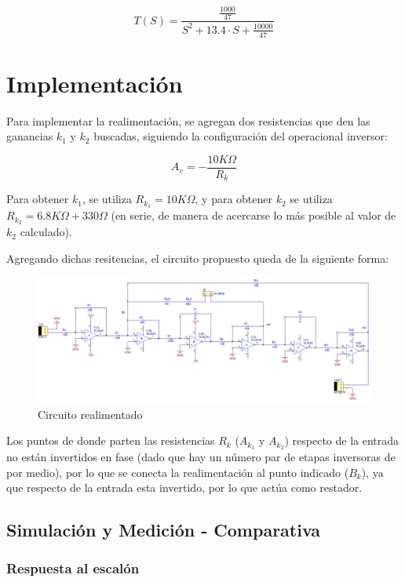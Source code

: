 \documentclass{article}
\begin{document}
\[
T(S) = \frac{\frac{1000}{47}}{S^2 + 13.4 \cdot S + \frac{10000}{47}}
\]

\section{Implementación}

Para implementar la realimentación, se agregan dos resistencias que den las ganancias $k_1$ y $k_2$ buscadas, siguiendo la configuración del operacional inversor:

\[
A_v = -\frac{10K\Omega}{R_k} 
\] 

Para obtener $k_1$, se utiliza $R_{k_1} = 10K\Omega$, y para obtener $k_2$ se utiliza $R_{k_2} = 6.8K\Omega + 330\Omega$ (en serie, de manera de acercarse lo más posible al valor de $k_2$ calculado).

\newpage

Agregando dichas resitencias, el circuito propuesto queda de la siguiente forma:

\begin{figure}[H]
\centering
\includegraphics[width=1\linewidth]{Imagenes/CircuitoRealimentado.png}
\caption{Circuito realimentado}
\label{fig:Circuito}
\end{figure}

Los puntos de donde parten las resistencias $R_k$ ($A_{k_1}$ y $A_{k_2}$) respecto de la entrada no están invertidos en fase (dado que hay un número par de etapas inversoras de por medio), por lo que se conecta la realimentación al punto indicado ($B_k$), ya que respecto de la entrada esta invertido, por lo que actúa como restador.

\subsection{Simulación y Medición - Comparativa}

\subsubsection{Respuesta al escalón}
\end{document}
